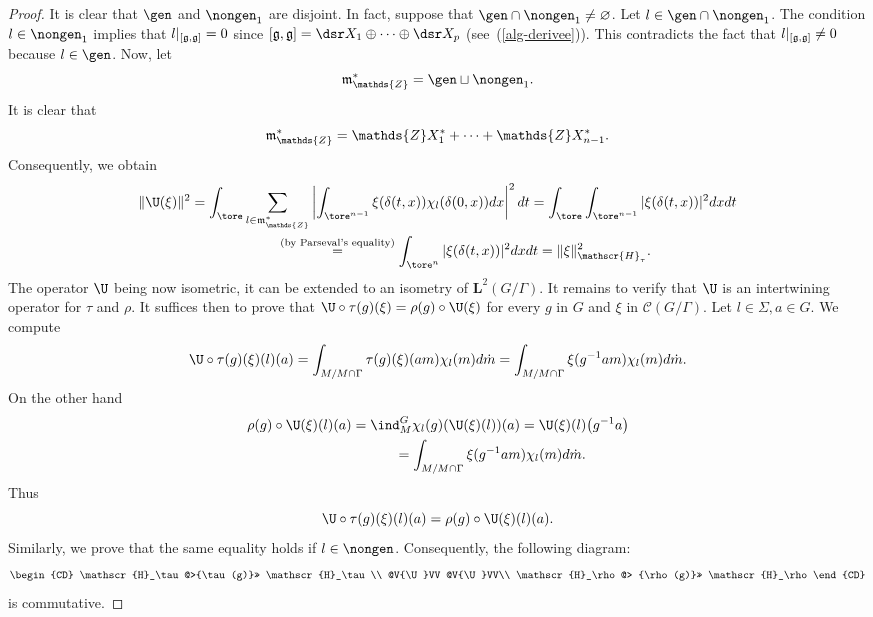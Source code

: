 \begin{proof}
It is clear that $\gen$ and $\nongen_1$ are disjoint. In fact,
suppose that $\gen\cap\nongen_1\ne \varnothing$. Let $l\in
\gen\cap\nongen_1$. The condition $l\in \nongen_1$ implies that
$l\vert_{[\frak g, \frak g]}= 0$ since $[\frak g, \frak g]=\dsr
X_1\oplus\cdots\oplus \dsr X_p$ (see~(\ref{alg-derivee})). This
contradicts the fact that $l\vert_{[\frak g, \frak g]}\ne 0$ because
$l\in \gen$. Now, let
\begin{gather}\label{disjoint-reunion}
\frak m_{\mathds{Z}}^* =\gen\sqcup \nongen_1.
\end{gather}
 It is
clear that
\[
\frak m_{\mathds{Z}}^* = \mathds{Z}X_1^*+\cdots
+\mathds{Z}X_{n-1}^*.
\]
 Consequently, we obtain
\begin{gather*} \|\U(\xi)\|^2
= \int_{\tore} \sum_{l\in \frak
m_{\mathds{Z}}^*} \left|\int_{\tore^{n-1}}
    \xi(\delta(t, x)) \chi_{l}(\delta(0, x))
dx \right|^2 dt   = \int_{\tore} \int_{\tore^{n-1}}
    |\xi(\delta(t, x))
 |^2 dx  dt \\
 \hphantom{\|\U(\xi)\|^2 }{}
 \overset{(\text{by Parseval's equality})}{=}  \int_{\tore^{n}}
    |\xi(\delta(t, x))
 |^2 dx  dt
   = \|\xi\|_{\mathscr{H}_\tau}^2.
\end{gather*}
The operator $\U$ being now isometric, it can be extended to an
isometry of $\mathbf{L}^2(G/\Gamma)$. It remains to verify that $\U$
is an intertwining operator for $\tau$ and $\rho$. It suf\/f\/ices then
to prove that  $\U\circ \tau(g)(\xi) = \rho(g) \circ \U(\xi)$ for
every  $g$ in $G$ and $\xi$ in $\mathcal{C}(G/\Gamma)$. Let $l\in
\Sigma, a\in G$. We compute
\[
\U\circ \tau(g)(\xi)(l)(a)=\int_{M/M\cap \Gamma} \tau(g)(\xi)(am)
\chi_l(m) d\dot{m}= \int_{M/M\cap \Gamma} \xi(g^{-1}am) \chi_l(m)
d\dot{m}.
\]
 On the other hand
\begin{gather*}
\rho(g) \circ \U(\xi)(l)(a)=\ind_M^G\chi_l(g)(\U(\xi)(l))(a)=
\U(\xi)(l)\big(g^{-1}a\big)\\
\hphantom{\rho(g) \circ \U(\xi)(l)(a)}{}
= \int_{M/M\cap \Gamma} \xi(g^{-1}am) \chi_l(m)
d\dot{m}.
\end{gather*}
Thus
\[
\U\circ \tau(g)(\xi)(l)(a)=\rho(g) \circ \U(\xi)(l)(a).
\]
Similarly, we prove that the same equality holds if $l\in \nongen$.
 Consequently,
 the following
diagram:
 \begin{gather}\label{intertwining}
\begin{CD} \mathscr{H}_\tau@>{\tau(g)}>> \mathscr{H}_\tau\\
@V{\U}VV  @V{\U}VV\\
\mathscr{H}_\rho @> {\rho(g)}>> \mathscr{H}_\rho
\end{CD}
\end{gather}
is commutative.
\end{proof}








